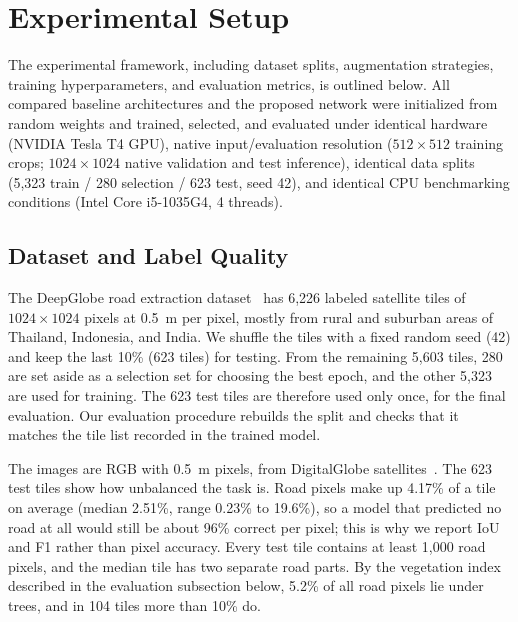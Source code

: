 \documentclass{ieeeaccess}
\begin{document}
\section{Experimental Setup}
\label{sec:setup}

The experimental framework, including dataset splits, augmentation strategies, training hyperparameters, and evaluation metrics, is outlined below. All compared baseline architectures and the proposed network were initialized from random weights and trained, selected, and evaluated under identical hardware (NVIDIA Tesla T4 GPU), native input/evaluation resolution ($512 \times 512$ training crops; $1024 \times 1024$ native validation and test inference), identical data splits (5,323 train / 280 selection / 623 test, seed 42), and identical CPU benchmarking conditions (Intel Core i5-1035G4, 4 threads).

\subsection{Dataset and Label Quality}

The DeepGlobe road extraction dataset~\cite{demir2018deepglobe} has 6,226 labeled satellite tiles of $1024 \times 1024$ pixels at 0.5~m per pixel, mostly from rural and suburban areas of Thailand, Indonesia, and India. We shuffle the tiles with a fixed random seed (42) and keep the last 10\% (623 tiles) for testing. From the remaining 5,603 tiles, 280 are set aside as a selection set for choosing the best epoch, and the other 5,323 are used for training. The 623 test tiles are therefore used only once, for the final evaluation. Our evaluation procedure rebuilds the split and checks that it matches the tile list recorded in the trained model.

The images are RGB with 0.5~m pixels, from DigitalGlobe satellites~\cite{demir2018deepglobe}. The 623 test tiles show how unbalanced the task is. Road pixels make up 4.17\% of a tile on average (median 2.51\%, range 0.23\% to 19.6\%), so a model that predicted no road at all would still be about 96\% correct per pixel; this is why we report IoU and F1 rather than pixel accuracy. Every test tile contains at least 1,000 road pixels, and the median tile has two separate road parts. By the vegetation index described in the evaluation subsection below, 5.2\% of all road pixels lie under trees, and in 104 tiles more than 10\% do.
\end{document}
